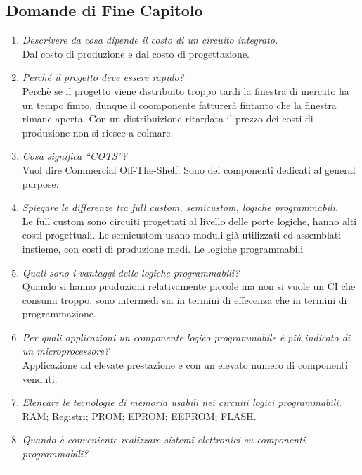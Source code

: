 \documentclass[12pt]{article}
\begin{document}
\subsection{Domande di Fine Capitolo}
\begin{enumerate}
    \item \emph{Descrivere da cosa dipende il costo di un circuito integrato.} \\
        Dal costo di produzione e dal costo di progettazione.

    \item \emph{Perché il progetto deve essere rapido?} \\
        Perch\`e se il progetto viene distribuito troppo tardi la finestra di mercato ha un tempo finito, dunque il coomponente fatturer\`a fintanto che la finestra rimane aperta. Con un distribuizione ritardata il prezzo dei costi di produzione non si riesce a colmare.

    \item \emph{Cosa significa “COTS”?} \\
        Vuol dire Commercial Off-The-Shelf. Sono dei componenti dedicati al general purpose.

    \item \emph{Spiegare le differenze tra full custom, semicustom, logiche programmabili.} \\
        Le full custom sono circuiti progettati al livello delle porte logiche, hanno alti costi progettuali. Le semicustom usano moduli gi\`a utilizzati ed assemblati instieme, con costi di produzione medi. Le logiche programmabili

    \item \emph{Quali sono i vantaggi delle logiche programmabili?} \\
        Quando si hanno pruduzioni relativamente piccole ma non si vuole un CI che consumi troppo, sono intermedi sia in termini di effecenza che in termini di programmazione.

    \item \emph{Per quali applicazioni un componente logico programmabile è più indicato di un microprocessore?} \\
        Applicazione ad elevate prestazione e con un elevato numero di componenti venduti.

    \item \emph{Elencare le tecnologie di memoria usabili nei circuiti logici programmabili.} \\
        RAM; Registri; PROM; EPROM; EEPROM; FLASH.

    \item \emph{Quando è conveniente realizzare sistemi elettronici su componenti programmabili?} \\
        --
\end{enumerate}
\end{document}
